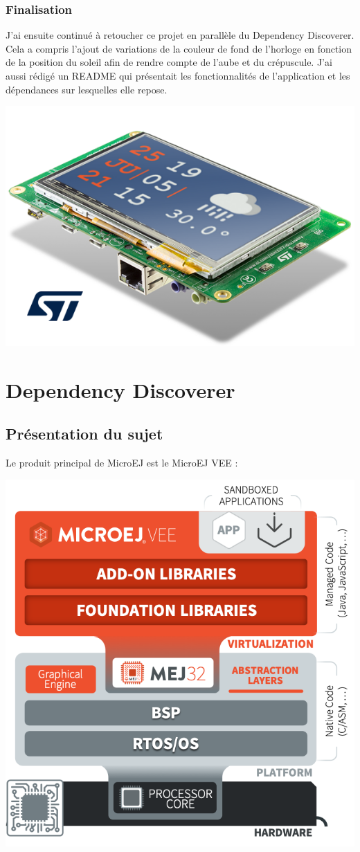 \documentclass[french,a4paper,12pt]{report}
\begin{document}
\subsection{Finalisation}

J'ai ensuite continué à retoucher ce projet en parallèle du Dependency Discoverer. Cela a compris l'ajout de variations de la couleur de fond de l'horloge en fonction de la position du soleil afin de rendre compte de l'aube et du crépuscule. J'ai aussi rédigé un README qui présentait les fonctionnalités de l'application et les dépendances sur lesquelles elle repose.

\begin{center}
\includegraphics[width=.5\textwidth]{./ressources/schemas/inSituationFin.png}
\end{center}


\chapter{Dependency Discoverer}

\section{Présentation du sujet}

Le produit principal de MicroEJ est le MicroEJ VEE :

\begin{center}
  \includegraphics[width=.6\textwidth]{ressources/schemas/Implementations-on-hardware_minimize.png}
\end{center}
\end{document}
